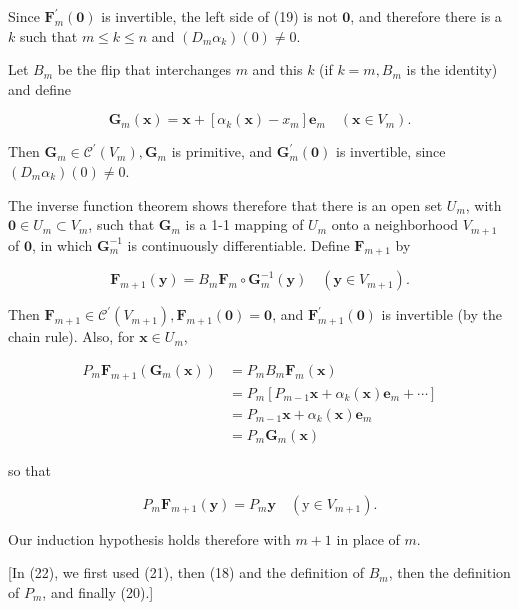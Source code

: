\documentclass[10pt]{article}
\begin{document}
Since $\mathbf{F}_{m}^{\prime}(\mathbf{0})$ is invertible, the left side of (19) is not $\mathbf{0}$, and therefore there is a $k$ such that $m \leq k \leq n$ and $\left(D_{m} \alpha_{k}\right)(0) \neq 0$.

Let $B_{m}$ be the flip that interchanges $m$ and this $k$ (if $k=m, B_{m}$ is the identity) and define

$$
\mathbf{G}_{m}(\mathbf{x})=\mathbf{x}+\left[\alpha_{k}(\mathbf{x})-x_{m}\right] \mathbf{e}_{m} \quad\left(\mathbf{x} \in V_{m}\right) .
$$

Then $\mathbf{G}_{m} \in \mathscr{C}^{\prime}\left(V_{m}\right), \mathbf{G}_{m}$ is primitive, and $\mathbf{G}_{m}^{\prime}(\mathbf{0})$ is invertible, since $\left(D_{m} \alpha_{k}\right)(0) \neq 0$.

The inverse function theorem shows therefore that there is an open set $U_{m}$, with $\mathbf{0} \in U_{m} \subset V_{m}$, such that $\mathbf{G}_{m}$ is a 1-1 mapping of $U_{m}$ onto a neighborhood $V_{m+1}$ of $\mathbf{0}$, in which $\mathbf{G}_{m}^{-1}$ is continuously differentiable. Define $\mathbf{F}_{m+1}$ by

$$
\mathbf{F}_{m+1}(\mathbf{y})=B_{m} \mathbf{F}_{m} \circ \mathbf{G}_{m}^{-1}(\mathbf{y}) \quad\left(\mathbf{y} \in V_{m+1}\right) .
$$

Then $\mathbf{F}_{m+1} \in \mathscr{C}^{\prime}\left(V_{m+1}\right), \mathbf{F}_{m+1}(\mathbf{0})=\mathbf{0}$, and $\mathbf{F}_{m+1}^{\prime}(\mathbf{0})$ is invertible (by the chain rule). Also, for $\mathbf{x} \in U_{m}$,

$$
\begin{aligned}
P_{m} \mathbf{F}_{m+1}\left(\mathbf{G}_{m}(\mathbf{x})\right) & =P_{m} B_{m} \mathbf{F}_{m}(\mathbf{x}) \\
& =P_{m}\left[P_{m-1} \mathbf{x}+\alpha_{k}(\mathbf{x}) \mathbf{e}_{m}+\cdots\right] \\
& =P_{m-1} \mathbf{x}+\alpha_{k}(\mathbf{x}) \mathbf{e}_{m} \\
& =P_{m} \mathbf{G}_{m}(\mathbf{x})
\end{aligned}
$$

so that

$$
P_{m} \mathbf{F}_{m+1}(\mathbf{y})=P_{m} \mathbf{y} \quad\left(\mathrm{y} \in V_{m+1}\right) .
$$

Our induction hypothesis holds therefore with $m+1$ in place of $m$.

[In (22), we first used (21), then (18) and the definition of $B_{m}$, then the definition of $P_{m}$, and finally (20).]
\end{document}
